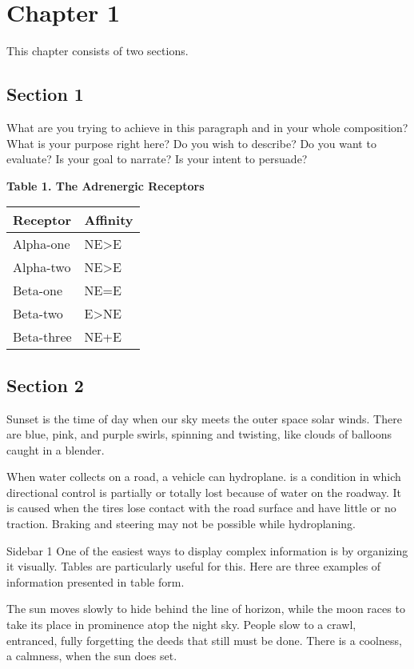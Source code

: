 \chapter{Chapter 1}
\label{chapter:1}

This chapter consists of two sections.

\section{Section 1}
\label{section:1}

What are you trying to achieve in this paragraph and in your whole composition? What is your purpose right here? Do you wish to describe? Do you want to evaluate? Is your goal to narrate? Is your intent to persuade?

\textbf{Table 1. The Adrenergic Receptors}
\begin{table}
    \begin{tabular}{|l|l|}
    \hline
    \textbf{Receptor}   & \textbf{Affinity} \\ \hline
    Alpha-one  & NE>E \\ \hline
    Alpha-two  & NE>E \\ \hline
    Beta-one   & NE=E \\ \hline
    Beta-two   & E>NE \\ \hline
    Beta-three & NE+E \\ \hline
    \end{tabular}
\end{table}

\section{Section 2}
\label{section:2}

Sunset is the time of day when our sky meets the outer space solar winds. There are blue, pink, and purple swirls, spinning and twisting, like clouds of balloons caught in a blender. 

When water collects on a road, a vehicle can hydroplane.  is a condition in which directional control is partially or totally lost because of water on the roadway. It is caused when the tires lose contact with the road surface and have little or no traction. Braking and steering may not be possible while hydroplaning.

\begin{sidebar}{Sidebar 1}
One of the easiest ways to display complex information is by organizing it visually. Tables are particularly useful for this. Here are three examples of information presented in table form.
\end{sidebar}

The sun moves slowly to hide behind the line of horizon, while the moon races to take its place in prominence atop the night sky. People slow to a crawl, entranced, fully forgetting the deeds that still must be done. There is a coolness, a calmness, when the sun does set.


